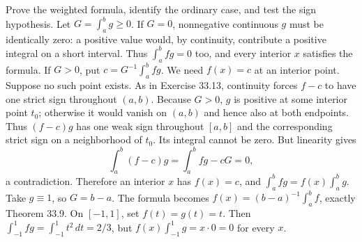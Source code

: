 \goal Prove the weighted formula, identify the ordinary case, and test
the sign hypothesis.
Let $G=\int_a^b g\ge0$. If $G=0$, nonnegative continuous $g$ must
be identically zero: a positive value would, by continuity, contribute
a positive integral on a short interval. Thus $\int_a^b fg=0$ too,
and every interior $x$ satisfies the formula.
If $G>0$, put $c=G^{-1}\int_a^b fg$. We need $f(x)=c$ at an
interior point. Suppose no such point exists. As in Exercise 33.13,
continuity forces $f-c$ to have one strict sign throughout $(a,b)$.
Because $G>0$, $g$ is positive at some interior point $t_0$;
otherwise it would vanish on $(a,b)$ and hence also at both endpoints.
Thus $(f-c)g$ has one weak sign throughout $[a,b]$ and the corresponding
strict sign on a neighborhood of $t_0$. Its integral cannot be zero.
But linearity gives
\[
 \int_a^b(f-c)g=\int_a^b fg-cG=0,
\]
a contradiction. Therefore an interior $x$ has $f(x)=c$, and
$\int_a^b fg=f(x)\int_a^b g$.
Take $g\equiv1$, so $G=b-a$. The formula becomes
$f(x)=(b-a)^{-1}\int_a^b f$, exactly Theorem 33.9.
On $[-1,1]$, set $f(t)=g(t)=t$. Then
$\int_{-1}^1 fg=\int_{-1}^1t^2\,dt=2/3$, but
$f(x)\int_{-1}^1g=x\cdot0=0$ for every $x$.

